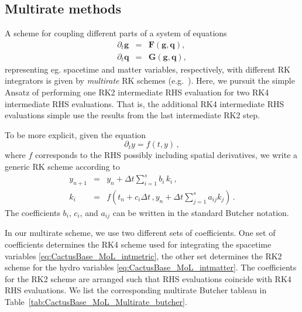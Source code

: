 \subsection{Multirate methods}
\label{CactusBase_MoL_sec:multiratemol}
A scheme for coupling different parts of a system of equations
\begin{eqnarray}
\partial_t \mathbf{g} &=& \mathbf{F}(\mathbf{g},\mathbf{q}) \label{eq:CactusBase_MoL_intmetric}, \\
\partial_t \mathbf{q} &=& \mathbf{G}(\mathbf{g},\mathbf{q}) \label{eq:CactusBase_MoL_intmatter},
\end{eqnarray}
representing eg. spacetime and matter variables, respectively, with different RK integrators is 
given by \emph{multirate} RK schemes (e.g.~\cite{CactusBase_MoL_schlegel:09, CactusBase_MoL_constantinescu:07}).
Here, we pursuit the simple Ansatz of performing one RK2 intermediate RHS evaluation for two RK4 intermediate RHS evaluations.
That is, the additional RK4 intermediate RHS evaluations simple use the results from the last intermediate RK2 step.

To be more explicit, given the equation
\begin{equation}
\partial_t y = f(t,y)\,,
\end{equation}
where $f$ corresponds to the RHS possibly including spatial derivatives,
we write a generic RK scheme according to
\begin{eqnarray}
y_{n+1} &=& y_n + \Delta t \sum_{i=1}^s b_i\, k_i\,, \\
k_i &=& f(t_n + c_i \Delta t\,, y_n + \Delta t \sum_{j=1}^s a_{ij} k_j)\,.
\end{eqnarray}
The coefficients $b_i$, $c_i$, and $a_{ij}$ can be written in the standard Butcher
notation.

In our multirate scheme, we use two different sets of coefficients. 
One set of coefficients determines the RK4 scheme used for integrating the spacetime variables \eqref{eq:CactusBase_MoL_intmetric}, the other set determines the RK2 scheme for the
hydro variables \eqref{eq:CactusBase_MoL_intmatter}. The coefficients for the RK2 scheme are arranged such that RHS evaluations coincide with
RK4 RHS evaluations.
We list the corresponding multirate Butcher tableau in Table~\ref{tab:CactusBase_MoL_Multirate_butcher}.


